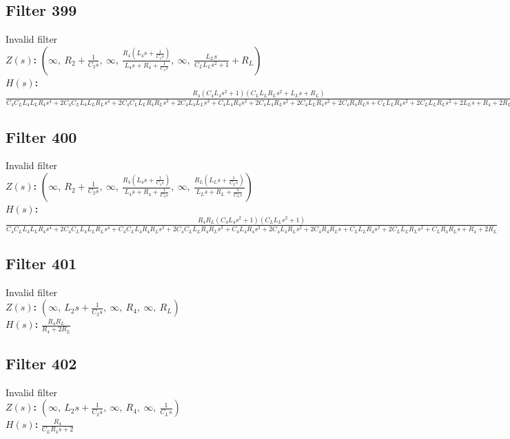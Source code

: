 \documentclass{article}
\begin{document}
\subsection*{Filter 399}
Invalid filter \\ 
\textbf{$Z(s)$:} $\left( \infty, \  R_{2} + \frac{1}{C_{2} s}, \  \infty, \  \frac{R_{4} \left(L_{4} s + \frac{1}{C_{4} s}\right)}{L_{4} s + R_{4} + \frac{1}{C_{4} s}}, \  \infty, \  \frac{L_{L} s}{C_{L} L_{L} s^{2} + 1} + R_{L}\right)$ \\ 
\textbf{$H(s)$:} $\frac{R_{4} \left(C_{4} L_{4} s^{2} + 1\right) \left(C_{L} L_{L} R_{L} s^{2} + L_{L} s + R_{L}\right)}{C_{4} C_{L} L_{4} L_{L} R_{4} s^{4} + 2 C_{4} C_{L} L_{4} L_{L} R_{L} s^{4} + 2 C_{4} C_{L} L_{L} R_{4} R_{L} s^{3} + 2 C_{4} L_{4} L_{L} s^{3} + C_{4} L_{4} R_{4} s^{2} + 2 C_{4} L_{4} R_{L} s^{2} + 2 C_{4} L_{L} R_{4} s^{2} + 2 C_{4} R_{4} R_{L} s + C_{L} L_{L} R_{4} s^{2} + 2 C_{L} L_{L} R_{L} s^{2} + 2 L_{L} s + R_{4} + 2 R_{L}}$ \\ 
\subsection*{Filter 400}
Invalid filter \\ 
\textbf{$Z(s)$:} $\left( \infty, \  R_{2} + \frac{1}{C_{2} s}, \  \infty, \  \frac{R_{4} \left(L_{4} s + \frac{1}{C_{4} s}\right)}{L_{4} s + R_{4} + \frac{1}{C_{4} s}}, \  \infty, \  \frac{R_{L} \left(L_{L} s + \frac{1}{C_{L} s}\right)}{L_{L} s + R_{L} + \frac{1}{C_{L} s}}\right)$ \\ 
\textbf{$H(s)$:} $\frac{R_{4} R_{L} \left(C_{4} L_{4} s^{2} + 1\right) \left(C_{L} L_{L} s^{2} + 1\right)}{C_{4} C_{L} L_{4} L_{L} R_{4} s^{4} + 2 C_{4} C_{L} L_{4} L_{L} R_{L} s^{4} + C_{4} C_{L} L_{4} R_{4} R_{L} s^{3} + 2 C_{4} C_{L} L_{L} R_{4} R_{L} s^{3} + C_{4} L_{4} R_{4} s^{2} + 2 C_{4} L_{4} R_{L} s^{2} + 2 C_{4} R_{4} R_{L} s + C_{L} L_{L} R_{4} s^{2} + 2 C_{L} L_{L} R_{L} s^{2} + C_{L} R_{4} R_{L} s + R_{4} + 2 R_{L}}$ \\ 
\subsection*{Filter 401}
Invalid filter \\ 
\textbf{$Z(s)$:} $\left( \infty, \  L_{2} s + \frac{1}{C_{2} s}, \  \infty, \  R_{4}, \  \infty, \  R_{L}\right)$ \\ 
\textbf{$H(s)$:} $\frac{R_{4} R_{L}}{R_{4} + 2 R_{L}}$ \\ 
\subsection*{Filter 402}
Invalid filter \\ 
\textbf{$Z(s)$:} $\left( \infty, \  L_{2} s + \frac{1}{C_{2} s}, \  \infty, \  R_{4}, \  \infty, \  \frac{1}{C_{L} s}\right)$ \\ 
\textbf{$H(s)$:} $\frac{R_{4}}{C_{L} R_{4} s + 2}$ \\ 
\end{document}
